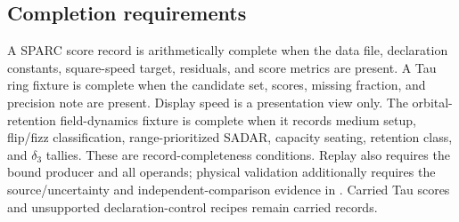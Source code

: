 \subsection{Completion requirements}\label{manual:field-dynamics-completion-requirements}
A SPARC score record is arithmetically complete when the data file, declaration constants, square-speed target, residuals, and score metrics are present. A Tau ring fixture is complete when the candidate set, scores, missing fraction, and precision note are present. Display speed is a presentation view only. The orbital-retention field-dynamics fixture is complete when it records medium setup, flip/fizz classification, range-prioritized SADAR, capacity seating, retention class, and \(\delta_3\) tallies.
These are record-completeness conditions. Replay also requires the bound
producer and all operands; physical validation additionally requires the
source/uncertainty and independent-comparison evidence in
. Carried Tau scores and unsupported
declaration-control recipes remain carried records.
